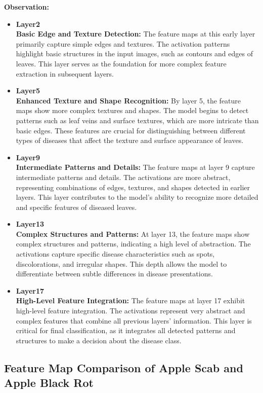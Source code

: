 \textbf{Observation: }
\begin{itemize}
    \item \textbf{Layer2}\\
    \textbf{Basic Edge and Texture Detection:}
    The feature maps at this early layer primarily capture simple edges and textures. The activation patterns highlight basic structures in the input images, such as contours and edges of leaves. This layer serves as the foundation for more complex feature extraction in subsequent layers.
    \item \textbf{Layer5}\\
    \textbf{Enhanced Texture and Shape Recognition:}
    By layer 5, the feature maps show more complex textures and shapes. The model begins to detect patterns such as leaf veins and surface textures, which are more intricate than basic edges. These features are crucial for distinguishing between different types of diseases that affect the texture and surface appearance of leaves.
    \item \textbf{Layer9}\\
    \textbf{Intermediate Patterns and Details:}
    The feature maps at layer 9 capture intermediate patterns and details. The activations are more abstract, representing combinations of edges, textures, and shapes detected in earlier layers. This layer contributes to the model's ability to recognize more detailed and specific features of diseased leaves.
    \item \textbf{Layer13}\\
    \textbf{Complex Structures and Patterns:}
    At layer 13, the feature maps show complex structures and patterns, indicating a high level of abstraction. The activations capture specific disease characteristics such as spots, discolorations, and irregular shapes. This depth allows the model to differentiate between subtle differences in disease presentations.
    \item \textbf{Layer17}\\
    \textbf{High-Level Feature Integration:}
    The feature maps at layer 17 exhibit high-level feature integration. The activations represent very abstract and complex features that combine all previous layers' information. This layer is critical for final classification, as it integrates all detected patterns and structures to make a decision about the disease class.
\end{itemize}


\subsection{Feature Map Comparison of Apple Scab and Apple Black Rot}

